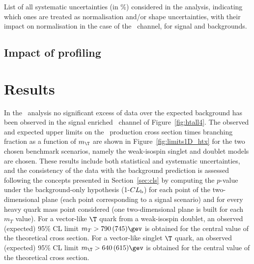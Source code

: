 \begin{table}[h!tb]
\begin{center}
\resizebox{1.\textwidth}{!}{
}
\caption{List of all systematic uncertainties (in \%) considered in the analysis, indicating which ones are treated
as normalisation and/or shape uncertainties, with their impact on normalisation in the case of the 
\chiv\ channel, for signal and backgrounds. \label{tab:htxSYS4b} }
\end{center}
\end{table}



\subsection{Impact of profiling}\label{sec:fullprof}



\section{Results}\label{sec:htxRES}

In the \htx\ analysis no significant excess of data over the 
expected background has been observed in the signal enriched 
\chiv\ channel of Figure~\ref{fig:htall4}.
The observed and expected upper limits on the \TTbar\ production cross section 
times branching fraction as a function of $m_{\T}$ are shown in 
Figure~\ref{fig:limits1D_htx} for the two chosen benchmark scenarios,
namely the weak-isospin singlet and
doublet models are chosen.
These results include both statistical and systematic uncertainties,
and the consistency of the data with the background prediction is 
assessed following the concepts presented in Section~\ref{sec:cls}
by computing the $p$-value under the background-only hypothesis
(1-$CL_{\rm b}$) for each point of the two-dimensional plane 
(each point corresponding to a signal scenario) and for every heavy 
quark mass point considered (one two-dimensional plane is built for each
$m_T$ value). For a vector-like $\T$ quark from a weak-isospin doublet, an observed (expected) 95\%  CL  limit
$m_{T}>790\,(745)\gev$ is obtained for the central value of the 
theoretical cross section.
For a vector-like singlet $\T$ quark, an observed (expected) 95\%  CL  limit 
$m_{\T}>640\,(615)\gev$ is obtained for the central value of the 
theoretical cross section.


